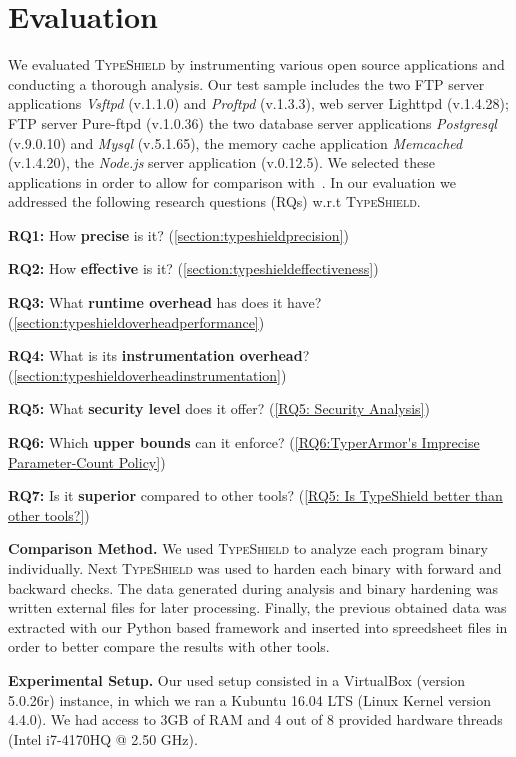 \section{Evaluation}
\label{chapter:Evaluation}
We evaluated \textsc{TypeShield} by instrumenting various open source applications and conducting a thorough analysis. Our test sample includes the two 
FTP server applications \textit{Vsftpd} (v.1.1.0) and \textit{Proftpd} (v.1.3.3), web server Lighttpd (v.1.4.28); FTP server Pure-ftpd (v.1.0.36) the two database server 
applications \textit{Postgresql} (v.9.0.10) and \textit{Mysql} (v.5.1.65), the memory cache application \textit{Memcached} (v.1.4.20), the \textit{Node.js} 
server application (v.0.12.5). We selected these applications in order to allow for comparison with~\cite{veen:typearmor}. 
In our evaluation we addressed the following research questions (RQs) w.r.t \textsc{TypeShield}.

\textbf{RQ1:} How \textbf{precise} is it? (\cref{section:typeshieldprecision})

\textbf{RQ2:} How \textbf{effective} is it? (\cref{section:typeshieldeffectiveness})

\textbf{RQ3:} What \textbf{runtime overhead} has does it have? (\cref{section:typeshieldoverheadperformance})

\textbf{RQ4:} What is its \textbf{instrumentation overhead}? (\cref{section:typeshieldoverheadinstrumentation})

\textbf{RQ5:} What \textbf{security level} does it offer? (\cref{RQ5: Security Analysis})

\textbf{RQ6:} Which \textbf{upper bounds} can it enforce? (\cref{RQ6:TyperArmor's Imprecise Parameter-Count Policy})

\textbf{RQ7:} Is it \textbf{superior} compared to other tools? (\cref{RQ5: Is TypeShield better than other tools?})

\textbf{Comparison Method.} We used \textsc{TypeShield} to analyze each program binary individually. Next \textsc{TypeShield} was used to harden each binary with forward and 
backward checks. The data generated during analysis and binary hardening was written external files for later processing. Finally, the previous obtained 
data was extracted with our Python based framework and inserted into spreedsheet files in order to better compare the results with other tools.

\textbf{Experimental Setup.} Our used setup consisted in a VirtualBox (version 5.0.26r) instance, in which we ran a Kubuntu 16.04 LTS (Linux Kernel
version 4.4.0). We had access to 3GB of RAM and 4 out of 8 provided hardware threads (Intel i7-4170HQ @ 2.50 GHz).

